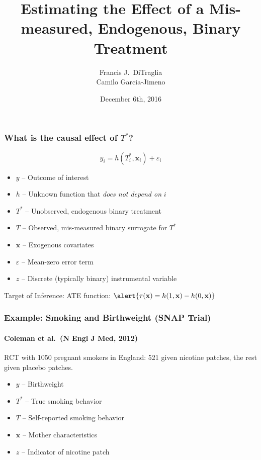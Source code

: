 \documentclass{beamer}
\title[Binary Regressors]{Estimating the Effect of a Mis-measured, Endogenous, Binary Treatment}
\author[FJ DiTraglia]{Francis J.\ DiTraglia\\ Camilo Garcia-Jimeno}
\institute{University of Pennsylvania}
\date{December 6th, 2016}
\begin{document}
 

\begin{frame}[plain]
	\titlepage 
\end{frame} 
\begin{frame}
  \frametitle{What is the causal effect of $T^*$?}
  \vspace{-1em}
  \[ y_i = h(T^*_i, \mathbf{x}_i) + \varepsilon_i\]
  \vspace{-1.5em}
  \begin{itemize}
    \item $y$ -- Outcome of interest
    \item $h$ -- Unknown function that \emph{does not depend on} $i$
    \item $T^*$ -- Unobserved, endogenous binary treatment
    \item $T$ -- Observed, mis-measured binary surrogate for $T^*$
    \item $\mathbf{x}$ -- Exogenous covariates
    \item $\varepsilon$ -- Mean-zero error term
    \item $z$ -- Discrete (typically binary) instrumental variable
  \end{itemize}

 \begin{block}{Target of Inference:}
   ATE function:  $\alert{\tau(\mathbf{x}) = h(1,\mathbf{x}) - h(0,\mathbf{x})}$
  \end{block}
\end{frame}
\begin{frame}
  \frametitle{Example: Smoking and Birthweight (SNAP Trial)}
\framesubtitle{Coleman et al.\ (N Engl J Med, 2012)}
  RCT with 1050 pregnant smokers in England: 521 given nicotine patches, the rest given placebo patches.
\begin{itemize}
  \item $y$ -- Birthweight 
  \item $T^*$ -- True smoking behavior 
  \item $T$ -- Self-reported smoking behavior
  \item $\mathbf{x}$ -- Mother characteristics
  \item $z$ -- Indicator of nicotine patch
\end{itemize}
   
\end{frame}
\end{document}
